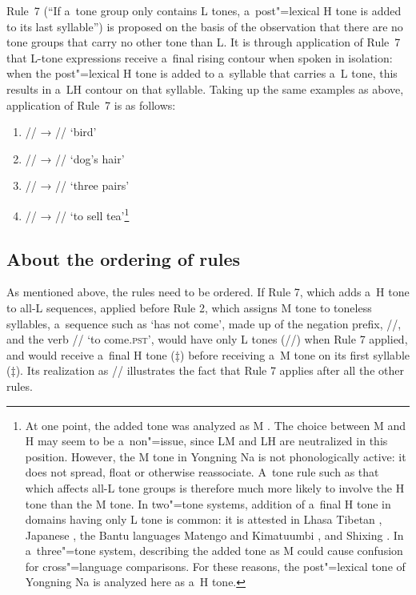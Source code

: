 Rule~7 (“If a~tone group only contains L tones, a~post"=lexical H tone is added to its last syllable”) is proposed on the basis of the observation that there are no tone groups that carry no other tone than L. It is through application of Rule~7 that L-tone expressions receive a~final rising contour when spoken in isolation: when the post"=lexical H tone is added to a~syllable that carries a~L tone, this results in a~LH contour on that syllable. Taking up the same examples as
above, application of Rule~7 is as follows: 

\begin{enumerate}[itemsep=-1mm]
	\item[] // → // ‘bird’ 
	\item[] // → // ‘dog’s hair’
	\item[] // → // ‘three
	pairs’ 
	\item[] // → // ‘to sell tea’\footnote{At one point, the added tone was analyzed as M \citep{michaud2008c}. The choice between M and H may seem to be
		a~non"=issue, since LM and LH are neutralized in this position. However, the M tone in Yongning Na is not
		phonologically active: it does not spread, float or otherwise reassociate. A~tone rule such as that which affects all-L tone groups is therefore much more likely to involve the H
		tone than the M tone. In two"=tone systems, addition of a~final H tone in domains having only L tone is common: it is attested in Lhasa {Tibetan} \citep[498-499]{sun1997}, {Japanese} \citep[19]{haraguchi1999}, the {Bantu} languages Matengo and Kimatuumbi \citep[415]{odden2005}, and
		{Shixing} \citep{chirkovaetal2009}. In a~three"=tone system, describing the added tone as M could cause confusion for cross"=language comparisons. For these reasons, the post"=lexical tone of Yongning Na is analyzed here as a~H tone.}
\end{enumerate}

\subsection{About the ordering of rules}
\label{sec:abouttheorderingofrules}

As mentioned above, the rules need to be ordered. If Rule 7, which adds a~H tone to all-L sequences,
applied before Rule 2, which assigns M tone to toneless syllables, a~sequence such as ‘has
not come’, made up of the negation prefix, \mbox{//}, and the verb // ‘to come.\textsc{pst}’, would
have only L tones (//) when Rule 7 applied, and would receive a~final H tone
($\ddagger${\kern2pt}) before receiving a~M tone on its first syllable ($\ddagger${\kern2pt}). Its realization as // illustrates the fact that Rule 7 applies after all the other rules. 

